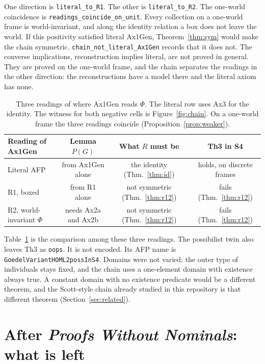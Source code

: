 \documentclass[11pt,a4paper]{article}
\newcommand{\lean}[1]{\texttt{#1}}
\theoremstyle{definition}
\theoremstyle{remark}
\begin{document}
One direction is \lean{literal\_to\_R1}.
The other is \lean{literal\_to\_R2}.
The one-world coincidence is \lean{readings\_coincide\_on\_unit}.
Every collection on a one-world frame is world-invariant, and along the
identity relation a box does not leave the world.
If this positivity satisfied literal Ax1Gen, Theorem~\ref{thm:sym} would make
the chain symmetric.
\lean{chain\_not\_literal\_Ax1Gen} records that it does not.
The converse implications, reconstruction implies literal, are not proved in
general.
They are proved on the one-world frame, and the chain separates the readings
in the other direction: the reconstructions have a model there and the literal
axiom has none.

\begin{table}[t]
\centering
\small
\begin{tabular}{@{}lccc@{}}
\toprule
Reading of Ax1Gen & Lemma \(P(G)\) & What \(R\) must be & Th3 in S4 \\
\midrule
Literal AFP &
  from Ax1Gen alone &
  the identity (Thm.~\ref{thm:id}) &
  holds, on discrete frames \\
R1, boxed &
  from R1 alone &
  not symmetric (Thm.~\ref{thm:r12}) &
  fails (Thm.~\ref{thm:r12}) \\
R2, world-invariant \(\Phi\) &
  needs Ax2a and Ax2b &
  not symmetric (Thm.~\ref{thm:r12}) &
  fails (Thm.~\ref{thm:r12}) \\
\bottomrule
\end{tabular}
\caption{Three readings of where Ax1Gen reads \(\Phi\).
The literal row uses Ax3 for the identity.
The witness for both negative cells is Figure~\ref{fig:chain}.
On a one-world frame the three readings coincide
(Proposition~\ref{prop:weaker}).}
\label{tab:readings}
\end{table}

Table~\ref{tab:readings} is the comparison among these three readings.
The possibilist twin also leaves Th3 as \lean{oops}.
It is not encoded.
Its AFP name is \lean{GoedelVariantHOML2possInS4}.
Domains were not varied: the outer type of individuals stays fixed, and the
chain uses a one-element domain with existence always true.
A constant domain with no existence predicate would be a different theorem,
and the Scott-style chain already studied in this repository is that
different theorem (Section~\ref{sec:related}).

\section{After \emph{Proofs Without Nominals}: what is left}
\label{sec:pwn-new}
\end{document}
